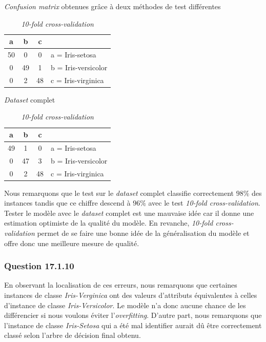 \documentclass[10pt,a4paper]{article}
\begin{document}
	   			\begin{table}[h]
	   				\centering
	   				\caption{\textit{Confusion matrix} obtenues grâce à deux méthodes de test différentes}
					\begin{subtable}{0.4\textwidth}
						\centering
						\begin{tabular}{|c|c|c|l|}
							\hline
							a & b & c & \\ 
							\hline
							50 & 0 & 0 & a = Iris-setosa\\
							\hline
							0 & 49 & 1 & b = Iris-versicolor\\
							\hline
							0 & 2 & 48 & c = Iris-virginica\\
							\hline
						\end{tabular}
						\caption{\textit{Dataset} complet}
					\end{subtable}%
					\begin{subtable}{0.4\textwidth}
						\centering
						\begin{tabular}{|c|c|c|l|}
							\hline
							a & b & c & \\ 
							\hline
							49 & 1 & 0 & a = Iris-setosa\\
							\hline
							0 & 47 & 3 & b = Iris-versicolor\\
							\hline
							0 & 2 & 48 & c = Iris-virginica\\
							\hline
						\end{tabular}
						\caption{\textit{10-fold cross-validation}}
					\end{subtable}
	   			\end{table}
 
				 Nous remarquons que le test sur le \textit{dataset} complet classifie correctement $98\%$ des instances tandis que ce chiffre descend à $96\%$ avec le test \textit{10-fold cross-validation}. Tester le modèle avec le \textit{dataset} complet est une mauvaise idée car il donne une estimation optimiste de la qualité du modèle. En revanche, \textit{10-fold cross-validation} permet de se faire une bonne idée de la généralisation du modèle et offre donc une meilleure mesure de qualité.
				 
			\subsubsection*{Question 17.1.10}
			
				En observant la localisation de ces erreurs, nous remarquons que certaines instances de classe \textit{Iris-Verginica} ont des valeurs d'attributs équivalentes à celles d'instance de classe \textit{Iris-Versicolor}. Le modèle n'a donc aucune chance de les différencier si nous voulons éviter l'\textit{overfitting}. D'autre part, nous remarquons que l'instance de classe \textit{Iris-Setosa} qui a été mal identifier aurait dû être correctement classé selon l'arbre de décision final obtenu. 
		
\end{document}
